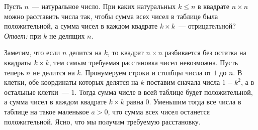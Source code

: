 \problem
Пусть $n$~--- натуральное число.
При каких натуральных $k \leq n$ в квадрате $n \times n$ можно расставить числа
так, чтобы сумма всех чисел в таблице была положительной, а сумма чисел в каждом
квадрате $k \times k$~--- отрицательной?
\solution
\emph{Ответ:} при $k$ не делящих $n$.
\par
Заметим, что если $n$ делится на $k$, то квадрат $n \times n$ разбивается без
остатка на квадраты $k \times k$, тем самым требуемая расстановка чисел
невозможна.
Пусть теперь $n$ не делится на $k$.
Пронумеруем строки и столбцы числа от $1$ до $n$.
В клетки, обе координаты которых делятся на $k$ поставим сначала числа
$1 - k^2$, а в остальные клетки~--- $1$.
Тогда сумма числе в всей таблице будет положительной, а сумма чисел в каждом
квадрате $k \times k$ равна $0$.
Уменьшим тогда все числа в таблице на такое маленькое $a > 0$, что сумма всех
чисел останется положительной.
Ясно, что мы получим требуемую расстановку.
\endproblem
